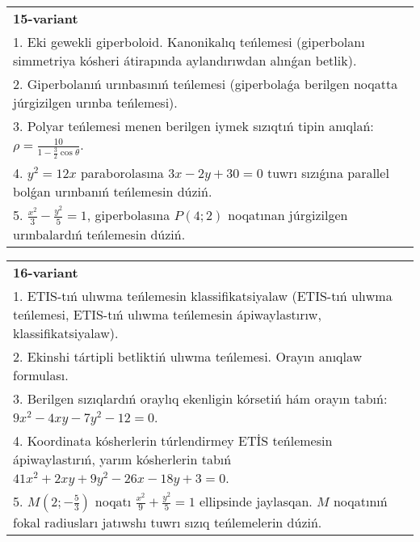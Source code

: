 \documentclass{article}
\begin{document}
\begin{tabular}{m{17cm}}
\textbf{15-variant}\\
1. Eki gewekli giperboloid. Kanonikalıq teńlemesi (giperbolanı simmetriya kósheri átirapında aylandırıwdan alınǵan betlik).\\

2. Giperbolanıń urınbasınıń teńlemesi (giperbolaǵa berilgen noqatta júrgizilgen urınba teńlemesi).\\

3. Polyar teńlemesi menen berilgen iymek sızıqtıń tipin anıqlań: $\rho=\frac{10}{1-\frac{3}{2}\cos\theta}$.\\

4. $y^{2} = 12x$ paraborolasına $3x - 2y + 30 = 0$ tuwrı sızıǵına parallel bolǵan urınbanıń teńlemesin dúziń.  \\

5. $\frac{x^{2}}{3} - \frac{y^{2}}{5} = 1$, giperbolasına $P(4;2)$ noqatınan júrgizilgen urınbalardıń teńlemesin dúziń.  
\end{tabular}
\vspace{1cm}


\begin{tabular}{m{17cm}}
\textbf{16-variant}\\
1. ETIS-tıń ulıwma teńlemesin klassifikatsiyalaw (ETIS-tıń ulıwma teńlemesi, ETIS-tıń ulıwma teńlemesin ápiwaylastırıw, klassifikatsiyalaw).\\

2. Ekinshi tártipli betliktiń ulıwma teńlemesi. Orayın anıqlaw formulası.\\

3. Berilgen sızıqlardıń oraylıq ekenligin kórsetiń hám orayın tabıń: $9 x^{2}-4 xy-7 y^{2}-12=0$.\\

4. Koordinata kósherlerin túrlendirmey ETİS teńlemesin ápiwaylastırıń, yarım kósherlerin tabıń $41x^{2} + 2xy + 9y^{2} - 26x - 18y + 3 = 0$.  \\

5. $M(2; - \frac{5}{3})$ noqatı $\frac{x^{2}}{9} + \frac{y^{2}}{5} = 1$ ellipsinde jaylasqan. $M$ noqatınıń fokal radiusları jatıwshı tuwrı sızıq teńlemelerin dúziń.  
\end{tabular}
\vspace{1cm}
\end{document}
